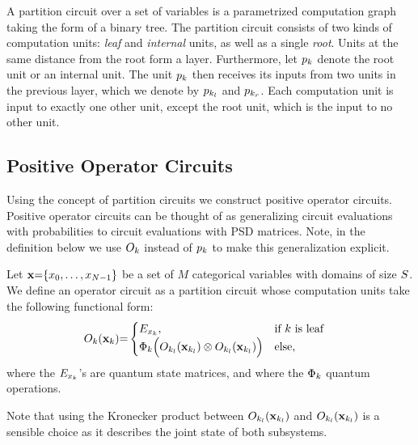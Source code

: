 \begin{definition}
	\label{def:partition_circuit}
	A partition circuit over a set of variables is a parametrized computation graph taking the form of a binary tree. The partition circuit consists of two kinds of computation units:
	\textit{leaf} and \textit{internal} units, as well as a single \textit{root}.
	Units at the same distance from the root form a layer.
	Furthermore, let $p_k$ denote the root unit or an internal unit. The unit $p_k$ then receives its inputs from two units in the previous layer, which we denote by $p_{k_l}$ and $p_{k_r}$. Each computation unit is input to exactly one other unit, except the root unit, which is the input to no other unit.
\end{definition}

\subsection{Positive Operator Circuits}

Using the concept of partition circuits we construct positive operator circuits. Positive operator circuits can be thought of as generalizing circuit evaluations with probabilities to circuit evaluations with PSD matrices. Note, in the definition below we use $O_k$ instead of $p_k$ to make this generalization explicit.
\begin{definition}
	\label{def:poc}
	Let   $\mathbf{x}{=}\{x_0,\dots ,x_{N{-}1}  \}$ be a set of $M$ categorical variables with domains of size $S$.
	We define an operator circuit as a partition circuit whose computation units take the following functional form:
	\begin{align}
		 & {O}_k(\mathbf{x}_k){=}
		\begin{cases}
			E_{x_k},
			 & \text{if $k$ is leaf}
			\\
			\Phi_k \Bigl(O_{k_l}(\mathbf{x}_{k_l}) \otimes O_{k_l}(\mathbf{x}_{k_l}) \Bigr)
			 & \text{else},
		\end{cases}
		\label{eq:poc:def}
	\end{align}
	where the  $E_{x_k}$'s are quantum state matrices, and where the $\Phi_k$ quantum operations.
\end{definition}
Note that using the Kronecker product between $O_{k_l}(\mathbf{x}_{k_l})$ and  $O_{k_l}(\mathbf{x}_{k_l})$ is a sensible choice as it describes the joint state of both subsystems.


